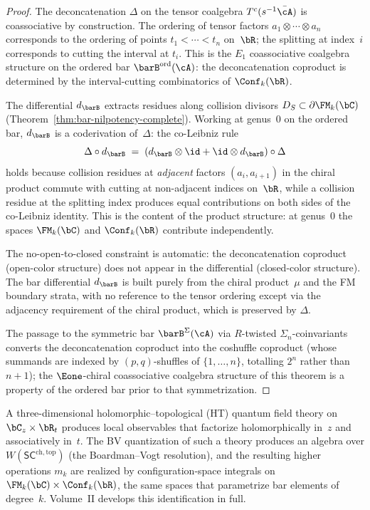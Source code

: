 \begin{proof}
The deconcatenation $\Delta$ on the tensor coalgebra
$T^c(s^{-1}\bar\cA)$ is coassociative by construction. The
ordering of tensor factors $a_1\otimes\cdots\otimes a_n$
corresponds to the ordering of points $t_1<\cdots<t_n$ on~$\bR$;
the splitting at index~$i$ corresponds to cutting the interval at
$t_i$. This is the $E_1$ coassociative coalgebra structure on the ordered bar
$\barB^{\mathrm{ord}}(\cA)$: the deconcatenation coproduct is
determined by the interval-cutting combinatorics of $\Conf_k(\bR)$.

The differential $d_{\barB}$ extracts residues along collision
divisors $D_S \subset \partial\FM_k(\bC)$
(Theorem~\ref{thm:bar-nilpotency-complete}). Working at genus~$0$
on the ordered bar, $d_{\barB}$ is a coderivation of~$\Delta$: the
co-Leibniz rule
\[
\Delta\circ d_{\barB} \;=\;
(d_{\barB}\otimes\id + \id\otimes d_{\barB})\circ \Delta
\]
holds because collision residues at \emph{adjacent} factors
$(a_i,a_{i+1})$ in the chiral product commute with cutting at
non-adjacent indices on~$\bR$, while a collision residue at the
splitting index produces equal contributions on both sides of the
co-Leibniz identity. This is the content of the product
structure: at genus~$0$ the spaces $\FM_k(\bC)$ and $\Conf_k(\bR)$
contribute independently.

The no-open-to-closed constraint is automatic: the deconcatenation
coproduct (open-color structure) does not appear in the differential
(closed-color structure). The bar differential $d_{\barB}$ is
built purely from the chiral product~$\mu$ and the FM boundary
strata, with no reference to the tensor ordering except via the
adjacency requirement of the chiral product, which is preserved by
$\Delta$.

The passage to the symmetric bar $\barB^{\Sigma}(\cA)$ via
$R$-twisted $\Sigma_n$-coinvariants converts the deconcatenation
coproduct into the coshuffle coproduct (whose summands are indexed
by $(p,q)$-shuffles of $\{1,\ldots,n\}$, totalling $2^n$ rather
than $n+1$); the $\Eone$-chiral coassociative coalgebra structure of this theorem
is a property of the ordered bar prior to that symmetrization.
\end{proof}

\begin{remark}
\label{rem:sc-physical}
A three-dimensional holomorphic--topological (HT) quantum field
theory on $\bC_z \times \bR_t$ produces local observables that
factorize holomorphically in~$z$ and associatively in~$t$. The BV
quantization of such a theory produces an algebra over
$W(\mathsf{SC}^{\mathrm{ch,top}})$ (the Boardman--Vogt resolution),
and the resulting higher operations $m_k$ are realized by
configuration-space integrals on
$\FM_k(\bC) \times \Conf_k(\bR)$, the same spaces that
parametrize bar elements of degree~$k$. Volume~II develops this
identification in full.
\end{remark}

